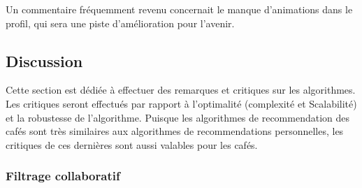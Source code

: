 \documentclass[11pt]{article}
\begin{document}
Un commentaire fréquemment revenu concernait le manque d'animations dans le profil, qui sera une piste d'amélioration pour l'avenir.

\subsection{Discussion}
\label{discussion}
Cette section est dédiée à effectuer des remarques et critiques sur les algorithmes. Les critiques seront effectués par rapport à l'optimalité (complexité et Scalabilité) et la robustesse de l'algorithme. Puisque les algorithmes de recommendation des cafés sont très similaires aux algorithmes de recommendations personnelles, les critiques de ces dernières sont aussi valables pour les cafés.

\subsubsection{Filtrage collaboratif}
\end{document}
